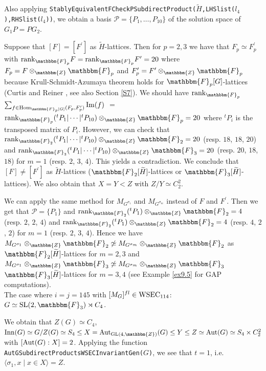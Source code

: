 \documentclass{amsart}
\theoremstyle{plain}
\theoremstyle{definition}
\theoremstyle{remark}
\newcommand{\bZ}{\mathbbm{Z}}\newcommand{\bQ}{\mathbbm{Q}}
\newcommand{\bF}{\mathbbm{F}}\newcommand{\bP}{\mathbbm{P}}
\newcommand{\GL}{{\rm GL}}\newcommand{\SL}{{\rm SL}}
\begin{document}
Also applying 
{\tt StablyEquivalentFCheckPSubdirectProduct($\widetilde{H}$,LHSlist($l_4$),RHSlist($l_4$))}, 
we obtain a basis 
$\mathcal{P}=\{P_1,\dots,P_{10}\}$ of the solution space of $G_1P=PG_2$. 

Suppose that $[F]=[F^\prime]$ as $\widetilde{H}$-lattices. 
Then for $p=2,3$ we have that 
$F_p\simeq F^\prime_p$ with 
${\rm rank}_{\bF_p} F={\rm rank}_{\bF_p} F^\prime=20$ 
where $F_p=F\otimes_\bZ \bF_p$ and $F^\prime_p=F^\prime\otimes_\bZ \bF_p$ 
because Krull-Schmidt-Azumaya theorem holds for $\bF_p[G]$-lattices 
(Curtis and Reiner \cite[Theorem 6.12]{CR81}, see also Section \ref{S7}). 
We should have 
${\rm rank}_{\bF_p}$ 
$\sum_{f\in {\rm Hom}_{\bF_p[G]}(F_p,F^\prime_p)}{\rm Im}(f)$ $=$ 
${\rm rank}_{\bF_p} ({}^tP_1|\cdots|{}^tP_{10})\otimes_\bZ \bF_p=20$ 
where ${}^tP_i$ is 
the transposed matrix of $P_i$. 
However, we can check that 
${\rm rank}_{\bF_2} ({}^tP_1|\cdots|{}^tP_{10})\otimes_\bZ \bF_2=20$ 
(resp. $18$, $18$, $20$)
and 
${\rm rank}_{\bF_3} ({}^tP_1|\cdots|{}^tP_{10})\otimes_\bZ \bF_3=20$ 
(resp. $20$, $18$, $18$) 
for $m=1$ (resp. $2$, $3$, $4$). 
This yields a contradiction. 
We conclude that $[F]\neq [F^\prime]$ as $\widetilde{H}$-lattices 
($\bF_2[\widetilde{H}]$-lattices or $\bF_3[\widetilde{H}]$-lattices). 
We also obtain that $X=Y<Z$ with $Z/Y\simeq C_2^2$. 

We can apply the same method for $M_{G^{\sigma_1}}$ and $M_{G^{\sigma_m}}$ 
instead of $F$ and $F^\prime$. 
Then we get that $\mathcal{P}=\{P_1\}$ and 
${\rm rank}_{\bF_2} ({}^tP_1)\otimes_\bZ \bF_2=4$ (resp. $2$, $2$, $4$) and 
${\rm rank}_{\bF_2} ({}^tP_1)\otimes_\bZ \bF_2=4$ (resp. $4$, $2$, $2$)  
for $m=1$ (resp. $2$, $3$, $4$). 
Hence we have 
$M_{G^{\sigma_1}}\otimes_\bZ \bF_2\not\simeq M_{G^{\sigma_m}}\otimes_\bZ \bF_2$ as $\bF_2[\widetilde{H}]$-lattices 
for $m=2,3$
and 
$M_{G^{\sigma_1}}\otimes_\bZ \bF_3\not\simeq M_{G^{\sigma_m}}\otimes_\bZ \bF_3$ $\bF_3[\widetilde{H}]$-lattices 
for $m=3,4$ 
(see Example \ref{ex9.5} for GAP computations).\\

The case where $i=j=145$ with $[M_G]^{fl}\in {\rm WSEC}_{114}$: $G\simeq \SL(2,\bF_3)\rtimes C_4$. 

We obtain that $Z(G)\simeq C_4$, 
${\rm Inn}(G)\simeq G/Z(G)\simeq S_4\leq 
X={\rm Aut}_{\GL(4,\bZ)}(G)\leq 
Y\leq Z\simeq {\rm Aut}(G)\simeq S_4\times C_2^2$ 
with $[{\rm Aut}(G):X]=2$. 
Applying the function 
{\tt AutGSubdirectProductsWSECInvariantGen(}$G${\tt)}, 
we see that $t=1$, 
i.e. $\langle \sigma_1,x\mid x\in X\rangle=Z$. 
\end{document}
